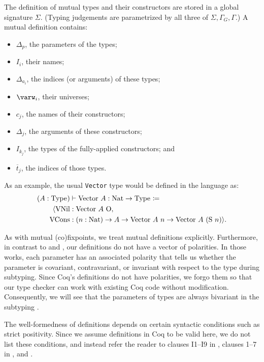 \documentclass[sigplan,10pt,anonymous,review]{acmart}
\begin{document}


The definition of mutual \coinductive types and their constructors are stored in a global signature $\Sigma$. (Typing judgements are parametrized by all three of $\Sigma, \Gamma_G, \Gamma$.) A mutual \coinductive definition contains:

\begin{itemize}
    \item $\Delta_p$, the parameters of the \coinductive types;
    \item $I_i$, their names;
    \item $\Delta_{a_i}$, the indices (or arguments) of these \coinductive types;
    \item $\varw_i$, their universes;
    \item $c_j$, the names of their constructors;
    \item $\Delta_j$, the arguments of these constructors;
    \item $I_{k_j}$, the \coinductive types of the fully-applied constructors; and
    \item $\overline{t}_j$, the indices of those \coinductive types.
\end{itemize}

As an example, the usual \texttt{Vector} type would be defined in the language as:
\begin{align*}
    (A : \Type{}) &\vdash \text{Vector}\ A: \text{Nat} \to \Type{} \coloneqq \\
        \langle \text{VNil} &: \text{Vector}\ A\ \text{O}, \\
        \text{VCons} &: (n: \text{Nat}) \to A \to \text{Vector}\ A\ n \to \text{Vector}\ A\ (\text{S}\ n) \rangle.
\end{align*}

As with mutual (co)\-fixpoints, we treat mutual \coinductive definitions explicitly. Furthermore, in contrast to \CIChat and \CIChatbar, our definitions do not have a vector of polarities. In those works, each parameter has an associated polarity that tells us whether the parameter is covariant, contravariant, or invariant with respect to the \coinductive type during subtyping. Since Coq's \coinductive definitions do not have polarities, we forgo them so that our type checker can work with existing Coq code without modification. Consequently, we will see that the parameters of \coinductive types are always bivariant in the subtyping .

The well-formedness of \coinductive definitions depends on certain syntactic conditions such as strict positivity. Since we assume definitions in Coq to be valid here, we do not list these conditions, and instead refer the reader to clauses I1--I9 in \cite{cic-hat-bar}, clauses 1--7 in \cite{cic-hat}, and \cite{coq}.
\end{document}
